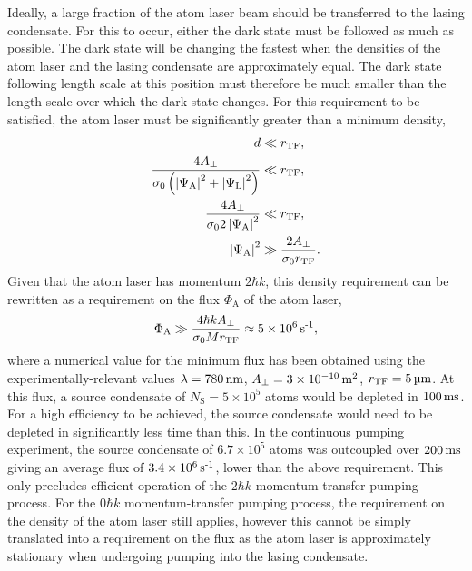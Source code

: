 Ideally, a large fraction of the atom laser beam should be transferred to the lasing condensate. For this to occur, either the dark state must be followed as much as possible.  The dark state will be changing the fastest when the densities of the atom laser and the lasing condensate are approximately equal.  The dark state following length scale at this position must therefore be much smaller than the length scale over which the dark state changes.  For this requirement to be satisfied, the atom laser must be significantly greater than a minimum density,
\begin{align}
    d & \ll r_\text{TF}, \\
    \frac{4 A_\perp}{\sigma_0 \left(\left|\Psi_\text{A}\right|^2 + \left|\Psi_\text{L}\right|^2\right)} & \ll r_\text{TF}, \notag\\
    \frac{4 A_\perp}{\sigma_0 2 \left|\Psi_\text{A}\right|^2} &\ll r_\text{TF}, \notag\\
    \left|\Psi_\text{A}\right|^2 &\gg \frac{2 A_\perp}{\sigma_0 r_\text{TF}}.
\end{align}
Given that the atom laser has momentum $2 \hbar k$, this density requirement can be rewritten as a requirement on the flux $\Phi_\text{A}$ of the atom laser,
\begin{align}
    \Phi_\text{A} \gg \frac{4 \hbar k A_\perp}{\sigma_0 M r_\text{TF}} \approx 5\times\unit[10^6]{s\textsuperscript{-1}},
\end{align}
where a numerical value for the minimum flux has been obtained using the experimentally-relevant values $\lambda = \unit[780]{nm}$, $A_\perp = 3\times \unit[10^{-10}]{m\textsuperscript{2}}$, $r_\text{TF} = \unit[5]{\micro m}$.  At this flux, a source condensate of $N_\text{S} = 5 \times 10^5$ atoms would be depleted in $\unit[100]{ms}$.  For a high efficiency to be achieved, the source condensate would need to be depleted in significantly less time than this.  In the continuous pumping experiment, the source condensate of $6.7 \times 10^5$ atoms was outcoupled over $\unit[200]{ms}$ giving an average flux of $3.4\times\unit[10^6]{s\textsuperscript{-1}}$, lower than the above requirement.  This only precludes efficient operation of the $2\hbar k$ momentum-transfer pumping process.  For the $0 \hbar k$ momentum-transfer pumping process, the requirement on the density of the atom laser still applies, however this cannot be simply translated into a requirement on the flux as the atom laser is approximately stationary when undergoing pumping into the lasing condensate.

